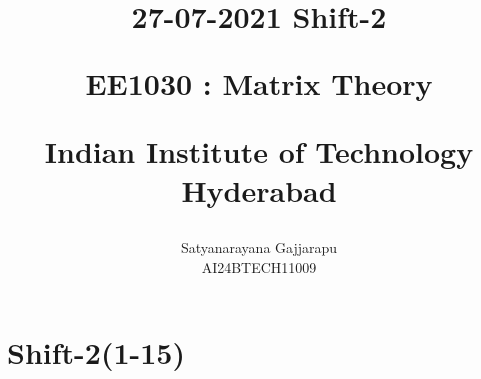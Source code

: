 \documentclass[journal]{IEEEtran}
\begin{document}

\vspace{3cm}




\title{
27-07-2021 Shift-2

\large{EE1030 : Matrix Theory}

Indian Institute of Technology Hyderabad
}
\author{Satyanarayana Gajjarapu

AI24BTECH11009
}	





\maketitle




\bigskip

\renewcommand{\thefigure}{\theenumi}
\renewcommand{\thetable}{\theenumi}


\section{\large Shift-2(1-15)}
\end{document}
